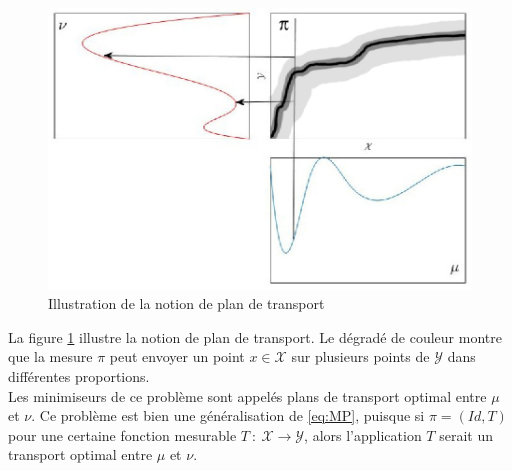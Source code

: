 \documentclass[a4paper,12pt]{article}
\begin{document}
\begin{figure}[!h]
\centering
\includegraphics[width=0.6\linewidth]{img/transport_plan2.jpg}
\caption{Illustration de la notion de plan de transport\label{fig:plantransp}}
\end{figure}
La figure \ref{fig:plantransp} illustre la notion de plan de transport. Le dégradé de couleur montre que la mesure $\pi$ peut envoyer un point $x\in\mathcal{X}$ sur plusieurs points de $\mathcal{Y}$ dans différentes proportions. \\

Les minimiseurs de ce problème sont appelés plans de transport optimal entre $\mu$ et $\nu$. Ce problème est bien une généralisation de \eqref{eq:MP}, puisque si $\pi = (Id,T)$ pour une certaine fonction mesurable $T\ :\ \mathcal{X}\rightarrow\mathcal{Y}$, alors l'application $T$ serait un transport optimal entre $\mu$ et $\nu$. \\
\end{document}
